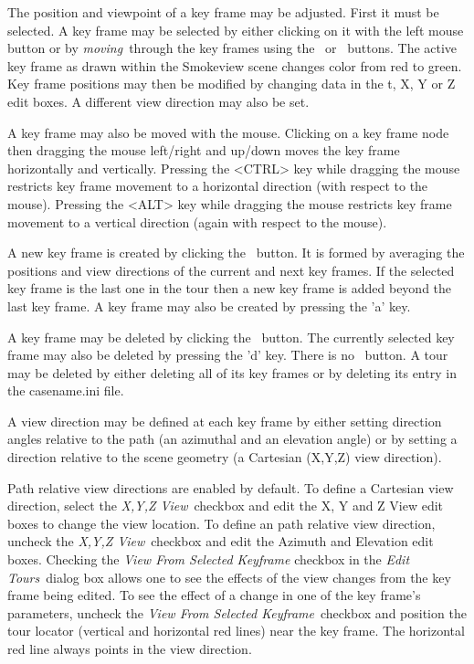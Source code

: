 \documentclass[11pt,twoside]{book}
\newcommand{\frameit}[1]{\fbox{\tt #1}}
\begin{document}
The position and viewpoint of a key frame may be adjusted.  First
it must be selected.  A key frame may be selected by either
clicking on it with the left mouse button or by {\em moving}\ through
the key frames using the \frameit{Next}\ or \frameit{Previous}\
buttons. The active key frame as drawn within the Smokeview scene changes color from red to green.
Key frame positions may then be modified by changing
data in the t, X, Y or Z edit boxes. A different view direction
may also be set.

A key frame may also be moved with the mouse.  Clicking on a key frame node then dragging the mouse left/right and up/down
moves the key frame horizontally and vertically.  Pressing the <CTRL> key while dragging the mouse
restricts key frame movement to a horizontal direction (with respect to the mouse).  Pressing the <ALT> key while dragging the mouse
restricts key frame movement to a vertical direction (again with respect to the mouse).

A new key frame is created by clicking the \frameit{Add}\ button.
It is formed by averaging the positions and view directions of the
current and next key frames. If the selected key frame is the last
one in the tour then a new key frame  is added beyond the last
key frame.  A key frame may also be created by pressing the 'a' key.

A key frame may be deleted by clicking the \frameit{Delete}\
button. The currently selected key frame may also be deleted by pressing the 'd' key.
There is no \frameit{Delete Tour}\ button. A tour may be
deleted by either deleting all of its key frames or by deleting its
entry in the casename.ini file.

A view direction may be defined at each key frame by either setting
direction angles relative to the path (an azimuthal and an elevation
angle) or by setting a direction relative to the scene geometry (a
Cartesian (X,Y,Z) view direction).

Path relative view directions are enabled by default.  To define a
Cartesian view direction, select the {\em X,Y,Z View}\ checkbox
and edit the X, Y and Z View edit boxes to change the view
location. To define an path relative view direction, uncheck the
{\em X,Y,Z View}\ checkbox and edit the Azimuth and Elevation edit
boxes. Checking the {\em View From Selected Keyframe} checkbox in
the {\em Edit Tours}\ dialog box allows one to see the effects of
the  view changes from the key frame being edited. To see the
effect of a change in one of the key frame's parameters, uncheck
the {\em View From Selected Keyframe}\ checkbox and position the
tour locator (vertical and horizontal red lines) near the
key frame.  The horizontal red line always points in the view
direction.
\end{document}
